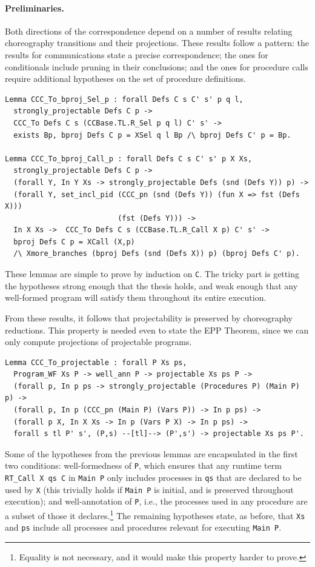 \documentclass[runningheads]{llncs}
\begin{document}
\paragraph{Preliminaries.}
Both directions of the correspondence depend on a number of results relating choreography
transitions and their projections.
These results follow a pattern: the results for communications state a precise
correspondence; the ones for conditionals include pruning in their conclusions; and the ones for
procedure calls require additional hypotheses on the set of procedure definitions.
\begin{lstlisting}
Lemma CCC_To_bproj_Sel_p : forall Defs C s C' s' p q l,
  strongly_projectable Defs C p ->
  CCC_To Defs C s (CCBase.TL.R_Sel p q l) C' s' ->
  exists Bp, bproj Defs C p = XSel q l Bp /\ bproj Defs C' p = Bp.

Lemma CCC_To_bproj_Call_p : forall Defs C s C' s' p X Xs,
  strongly_projectable Defs C p ->
  (forall Y, In Y Xs -> strongly_projectable Defs (snd (Defs Y)) p) ->
  (forall Y, set_incl_pid (CCC_pn (snd (Defs Y)) (fun X => fst (Defs X)))
                          (fst (Defs Y))) ->
  In X Xs ->  CCC_To Defs C s (CCBase.TL.R_Call X p) C' s' ->
  bproj Defs C p = XCall (X,p)
  /\ Xmore_branches (bproj Defs (snd (Defs X)) p) (bproj Defs C' p).
\end{lstlisting}
These lemmas are simple to prove by induction on \lstinline+C+.
The tricky part is getting the hypotheses strong enough that the thesis holds, and weak enough that any well-formed program will satisfy them throughout its entire execution.

From these results, it follows that projectability is preserved by choreography reductions.
This property is needed even to state the EPP Theorem, since we can only compute projections of projectable programs.
\begin{lstlisting}
Lemma CCC_To_projectable : forall P Xs ps,
  Program_WF Xs P -> well_ann P -> projectable Xs ps P ->
  (forall p, In p ps -> strongly_projectable (Procedures P) (Main P) p) ->
  (forall p, In p (CCC_pn (Main P) (Vars P)) -> In p ps) ->
  (forall p X, In X Xs -> In p (Vars P X) -> In p ps) ->
  forall s tl P' s', (P,s) --[tl]--> (P',s') -> projectable Xs ps P'.
\end{lstlisting}
Some of the hypotheses from the previous lemmas are encapsulated in the first two conditions:
well-formedness of \lstinline+P+, which ensures that any runtime term \lstinline+RT_Call X qs C+ in
\lstinline+Main P+ only includes processes in \lstinline+qs+ that are declared to be used by
\lstinline+X+ (this trivially holds if \lstinline+Main P+ is initial, and is preserved throughout
execution); and well-annotation of \lstinline+P+, i.e., the processes used in any
procedure are a subset of those it declares.\footnote{Equality is not necessary, and it would make
  this property harder to prove.}
The remaining hypotheses state, as before, that
\lstinline+Xs+ and \lstinline+ps+ include
all processes and procedures relevant for executing \lstinline+Main P+.
\end{document}
